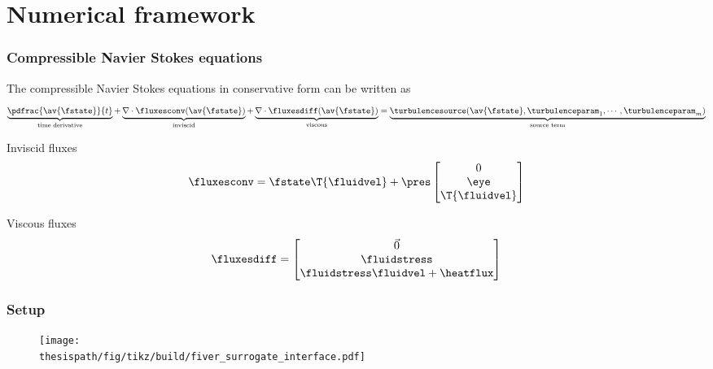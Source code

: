\section{Numerical framework}



\begin{frame}
\frametitle{Compressible Navier Stokes equations}
The compressible Navier Stokes equations in conservative form can be written as
\begin{equation*}
\underbrace{\pdfrac{\av{\fstate}}{t}}_{\text{time derivative}} +
\underbrace{\nabla\cdot\fluxesconv(\av{\fstate})}_{\text{inviscid}} + 
\underbrace{\nabla\cdot\fluxesdiff(\av{\fstate})}_{\text{viscous}} =
\underbrace{\turbulencesource(\av{\fstate},\turbulenceparam_1,\cdots,\turbulenceparam_m)}_{\text{source term}}
\end{equation*}

Inviscid fluxes
\begin{align*}
\fluxesconv
&=
\fstate \T{\fluidvel} + \pres
\begin{bmatrix}
0\\ \eye \\ \T{\fluidvel}
\end{bmatrix} \\
\end{align*}

Viscous fluxes
\begin{align*}\label{eq:fluxes_diff}
\fluxesdiff&=
\begin{bmatrix}
\vec{0}  \\
\fluidstress \\
\fluidstress \fluidvel + \heatflux
\end{bmatrix} \\
\end{align*}

\end{frame}



\begin{frame}
\frametitle{Setup}
\begin{figure}[h!]
	\begin{center}
        \texttt{[image: \\thesispath/fig/tikz/build/fiver\_surrogate\_interface.pdf]}
    \end{center}
\end{figure}
\end{frame}



